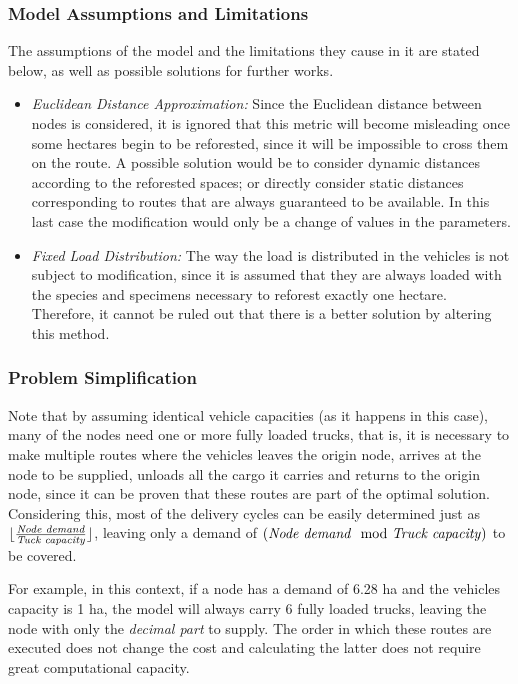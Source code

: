 \documentclass{amsart}
\begin{document}
    \subsubsection{Model Assumptions and Limitations}
        The assumptions of the model and the limitations they cause in it are stated below, as well as possible solutions for further works.
        
        \begin{itemize}
            \item \textit{Euclidean Distance Approximation:} Since the Euclidean distance between nodes is considered, it is ignored that this metric will become misleading once some hectares begin to be reforested, since it will be impossible to cross them on the route. A possible solution would be to consider dynamic distances according to the reforested spaces; or directly consider static distances corresponding to routes that are always guaranteed to be available. In this last case the modification would only be a change of values in the parameters.
            \item \textit{Fixed Load Distribution:} The way the load is distributed in the vehicles is not subject to modification, since it is assumed that they are always loaded with the species and specimens necessary to reforest exactly one hectare. Therefore, it cannot be ruled out that there is a better solution by altering this method.
        \end{itemize}
    
    
    \subsubsection{Problem Simplification}
    
    Note that by assuming identical vehicle capacities (as it happens in this case), many of the nodes need one or more fully loaded trucks, that is, it is necessary to make multiple routes where the vehicles leaves the origin node, arrives at the node to be supplied, unloads all the cargo it carries and returns to the origin node, since it can be proven that these routes are part of the optimal solution. Considering this, most of the delivery cycles can be easily determined just as $\lfloor\frac{\text{\textit{Node demand}}}{\text{\textit{Tuck capacity}}}\rfloor$, leaving only a demand of $\left( \text{\textit{Node demand}} \mod \text{\textit{Truck capacity}} \right)$ to be covered.
    
    For example, in this context, if a node has a demand of 6.28 ha and the vehicles capacity is 1 ha, the model will always carry 6 fully loaded trucks, leaving the node with only the \textit{decimal part} to supply. The order in which these routes are executed does not change the cost and calculating the latter does not require great computational capacity.
\end{document}
